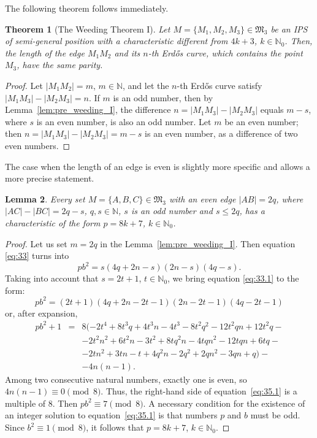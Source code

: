 \documentclass[a4paper,14pt]{article} %
\theoremstyle{plain}
\newtheorem{theorem}{Theorem}[section]
\newtheorem{lemma}[theorem]{Lemma}
\theoremstyle{definition}
\begin{document}
The following theorem follows immediately.

\begin{theorem}[The Weeding Theorem I]
	\label{thm:weeding_I}
	Let $M = \{M_1, M_2, M_3\} \in \mathfrak{M}_3$ be an IPS of semi-general position with a characteristic different from $4k+3$, $k \in \mathbb{N}_0$. Then, the length of the edge $M_1 M_2$ and its $n$-th Erdős curve, which contains the point $M_3$, have the same parity.
\end{theorem}

\begin{proof}
	Let $|M_1 M_2| = m$, $m \in \mathbb{N}$, and let the $n$-th Erdős curve satisfy $|M_1 M_3| - |M_2 M_3| = n$.
	If $m$ is an odd number, then by Lemma~\ref{lem:pre_weeding_I}, the difference $n = |M_1 M_3| - |M_2 M_3|$ equals $m - s$, where $s$ is an even number, is also an odd number.
	Let $m$ be an even number; then $n = |M_1 M_3| - |M_2 M_3| = m - s$ is an even number, as a difference of two even numbers.
\end{proof}

The case when the length of an edge is even is slightly more specific and allows a more precise statement.

\begin{lemma}
	\label{lem:pre_weeding_II}
	Every set $M = \{A, B, C\} \in \mathfrak{M}_3$ with an even edge $|AB| = 2q$, where $|AC| - |BC| = 2q - s$, $q, s \in \mathbb{N}$, $s$ is an odd number and $s \leq 2q$, has a characteristic of the form $p = 8k + 7$, $k \in \mathbb{N}_0$.
\end{lemma}

\begin{proof}
	Let us set $m = 2q$ in the Lemma~\ref{lem:pre_weeding_I}.
	Then equation \eqref{eq:33} turns into
	\begin{equation}
		\label{eq:33.1}
		pb^2 = s(4q + 2n - s)(2n - s)(4q - s).
	\end{equation}
	Taking into account that $s = 2t + 1$, $t \in \mathbb{N}_0$,
	we bring equation \eqref{eq:33.1} to the form:
	\begin{equation}
	pb^2 = (2t + 1)(4q + 2n - 2t - 1)(2n - 2t - 1)(4q - 2t - 1)
	\label{eq: 34.2}
	\end{equation}
	or, after expansion,
	\begin{eqnarray}
		pb^2 + 1&=& 8(-2t^4+8t^3q+4t^3n-4t^3-8t^2q^2-12t^2qn+12t^2q- {}\nonumber\\
			 &     &-2t^2n^2+6t^2n-3t^2+8tq^2n-4tqn^2-12tqn+6tq- {}\nonumber\\
			 &     &-2tn^2+3tn-t+4q^2n-2q^2+2qn^2-3qn+q)-  {}\nonumber\\
			   &     &-4n(n-1).
		\label{eq:35.1}
	\end{eqnarray}
	Among two consecutive natural numbers,
	exactly one is even,
	so $4n(n-1)\equiv0\pmod{8}$.
	Thus, the right-hand side of equation~\eqref{eq:35.1} is a multiple of 8.
	Then $pb^2\equiv7\pmod{8}$.
	A necessary condition for the existence of an integer solution to equation~\eqref{eq:35.1}
	is that numbers $p$ and $b$ must be odd.
	Since $b^2\equiv1\pmod{8}$, it follows that $p=8k+7$, $k\in\mathbb{N}_0$.
\end{proof}
\end{document}
